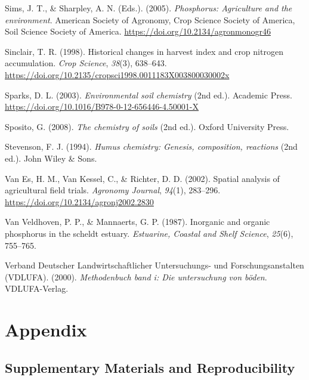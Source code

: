 \documentclass[
  a4paper,
]{article}
\newlength{\cslhangindent}
\newenvironment{CSLReferences}[2] %
 {\begin{list}{}{%
  \setlength{\itemindent}{0pt}
  \setlength{\leftmargin}{0pt}
  \setlength{\parsep}{0pt}
  \ifodd #1
   \setlength{\leftmargin}{\cslhangindent}
   \setlength{\itemindent}{-1\cslhangindent}
  \fi
  \setlength{\itemsep}{#2\baselineskip}}}
 {\end{list}}
\begin{document}
\begin{CSLReferences}{1}{0}
Sims, J. T., \& Sharpley, A. N. (Eds.). (2005). \emph{Phosphorus:
Agriculture and the environment}. American Society of Agronomy, Crop
Science Society of America, Soil Science Society of America.
\url{https://doi.org/10.2134/agronmonogr46}

Sinclair, T. R. (1998). Historical changes in harvest index and crop
nitrogen accumulation. \emph{Crop Science}, \emph{38}(3), 638--643.
\url{https://doi.org/10.2135/cropsci1998.0011183X003800030002x}

Sparks, D. L. (2003). \emph{Environmental soil chemistry} (2nd ed.).
Academic Press. \url{https://doi.org/10.1016/B978-0-12-656446-4.50001-X}

Sposito, G. (2008). \emph{The chemistry of soils} (2nd ed.). Oxford
University Press.

Stevenson, F. J. (1994). \emph{Humus chemistry: Genesis, composition,
reactions} (2nd ed.). John Wiley \& Sons.

Van Es, H. M., Van Kessel, C., \& Richter, D. D. (2002). Spatial
analysis of agricultural field trials. \emph{Agronomy Journal},
\emph{94}(1), 283--296. \url{https://doi.org/10.2134/agronj2002.2830}

Van Veldhoven, P. P., \& Mannaerts, G. P. (1987). Inorganic and organic
phosphorus in the scheldt estuary. \emph{Estuarine, Coastal and Shelf
Science}, \emph{25}(6), 755--765.

Verband Deutscher Landwirtschaftlicher Untersuchungs- und
Forschungsanstalten (VDLUFA). (2000). \emph{Methodenbuch band i: Die
untersuchung von böden}. VDLUFA-Verlag.

\end{CSLReferences}

\section{Appendix}\label{appendix}

\subsection{Supplementary Materials and
Reproducibility}\label{supplementary-materials-and-reproducibility}
\end{document}
